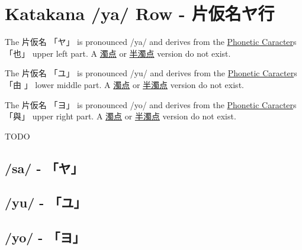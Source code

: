 \section{Katakana /ya/ Row - 片仮名ヤ行}\label{sec:KatakanaYaRow}


 The  片仮名 {「ヤ」} is pronounced  /ya/ and  derives from the
\hyperref[sec:PhoneticCharacter]{Phonetic Caracter}s {「也」} upper left part.  A
\hyperref[sec:Dakuten]{濁点} or \hyperref[sec:Handakuten]{半濁点} version do
not exist.

 The  片仮名 {「ユ」} is pronounced  /yu/ and  derives from the
\hyperref[sec:PhoneticCharacter]{Phonetic Caracter}s {「由 」} lower middle part.  A
\hyperref[sec:Dakuten]{濁点} or \hyperref[sec:Handakuten]{半濁点} version do
not exist.

 The  片仮名 {「ヨ」} is pronounced  /yo/ and  derives from the
\hyperref[sec:PhoneticCharacter]{Phonetic Caracter}s {「與」} upper right part.  A
\hyperref[sec:Dakuten]{濁点} or \hyperref[sec:Handakuten]{半濁点} version do
not exist.

\newpage
TODO

\newpage

\subsection{/sa/ - 「ヤ」}\label{sec:KatakanaYa}

 

\subsection{/yu/ - 「ユ」}\label{sec:KatakanaYu}

 

\subsection{/yo/ - 「ヨ」}\label{sec:KatakanaYo}

 






\newpage
